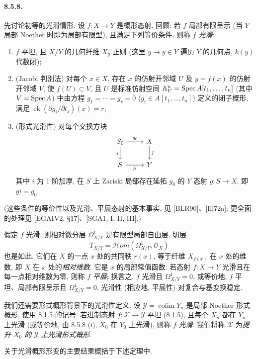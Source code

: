 \paragraph{8.5.8.}
先讨论初等的光滑情形. 设 $f:X\to Y$ 是概形态射. 回顾: 若 $f$ 局部有限呈示 (当 $Y$ 局部 Noether 时即为局部有限型), 且满足下列等价条件, 则称 $f$ \emph{光滑}:
\begin{enumerate}
\item[(i)] $f$ 平坦, 且 $X/Y$ 的几何纤维 $X_{\bar y}$ 正则 (这里 $\bar y\to y\in Y$ 遍历 $Y$ 的几何点, $k(\bar y)$ 代数闭);
\item[(ii)] (Jacobi 判别法) 对每个 $x\in X$, 存在 $x$ 的仿射开邻域 $U$ 及 $y=f(x)$ 的仿射开邻域 $V$, 使 $f(U)\subset V$, 且 $U$ 是标准仿射空间 $\mathbb A_V^n=\operatorname{Spec} A[t_1,\ldots,t_n]$ (其中 $V=\operatorname{Spec} A$) 中由方程 $g_1=\cdots=g_r=0$ ($g_i\in A[t_1,\ldots,t_n]$) 定义的闭子概形, 满足 $\operatorname{rk}(\partial g_i/\partial t_j)(x)=r$;
\item[(iii)] (形式光滑性) 对每个交换方块
\[\begin{tikzcd}S_0\arrow[r,"g_0"]\arrow[d,"i"']&X\arrow[d,"f"]\\S\arrow[r,"h"']&Y\end{tikzcd}\]
其中 $i$ 为 1 阶加厚, 在 $S$ 上 Zariski 局部存在延拓 $g_0$ 的 $Y$ 态射 $g:S\to X$, 即 $gi=g_0$.
\end{enumerate}
(这些条件的等价性以及光滑、平展态射的基本事实, 见 [BLR90]、[Ill72a]; 更全面的处理见 [EGAIV2, §17]、[SGA1, I, II, III].)

假定 $f$ 光滑. 则相对微分层 $\Omega^1_{X/Y}$ 是有限型局部自由层, 切层
\[T_{X/Y}=\mathcal Hom(\Omega^1_{X/Y},\mathcal O_X)\]
也是如此. 它们在 $X$ 的一点 $x$ 处的共同秩 $r(x)$, 等于纤维 $X_{f(x)}$ 在 $x$ 处的维数, 即 $X$ 在 $x$ 处的\emph{相对维数}. 它是 $x$ 的局部常值函数. 若态射 $f:X\to Y$ 光滑且在每一点相对维数为零, 则称 $f$ \emph{平展}; 换言之, $f$ 光滑且 $\Omega^1_{X/Y}=0$, 或等价地, $f$ 平坦、局部有限呈示且 $\Omega^1_{X/Y}=0$. 光滑性 (相应地, 平展性) 对复合与基变换稳定.

我们还需要形式概形背景下的光滑性定义. 设 $\mathcal Y=\operatorname{colim}Y_n$ 是局部 Noether 形式概形, 使用 8.1.5 的记号. 若进制态射 $f:\mathcal X\to\mathcal Y$ 平坦 (8.1.5), 且每个 $X_n$ 都在 $Y_n$ 上光滑 (或等价地, 由 8.5.8 (i), $X_0$ 在 $Y_0$ 上光滑), 则称 $f$ \emph{光滑}. 我们将称 $\mathcal X$ 为\emph{提升 $X_0$ 的 $\mathcal Y$ 上光滑形式概形}.

关于光滑概形形变的主要结果概括于下述定理中.

